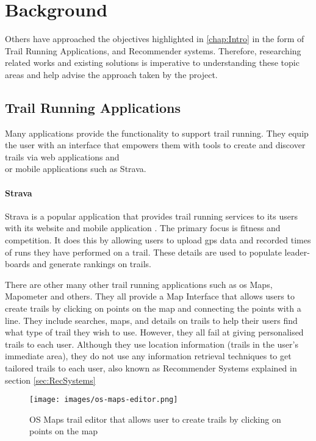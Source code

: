 \chapter{Background}
Others have approached the objectives highlighted in \autoref{chap:Intro} in the form of Trail Running Applications, and Recommender systems. Therefore, researching related works and existing solutions is imperative to understanding these topic areas and help advise the approach taken by the project.

\section{Trail Running Applications} \label{sec:TrailRunningApplications}
Many applications provide the functionality to support trail running. They equip the user with an interface that empowers them with tools to create and discover trails via web applications and\\or mobile applications such as Strava. 

\subsubsection{Strava}
Strava is a popular application that provides trail running services to its users with its website and mobile application \cite{strava}.  The primary focus is fitness and competition.  It does this by allowing users to upload \acrfull{gps} data and recorded times of runs they have performed on a trail. These details are used to populate leader-boards and generate rankings on trails.


There are other many other trail running applications such as \acrfull{os} Maps, Mapometer and others. They all provide a Map Interface that allows users to create trails by clicking on points on the map and connecting the points with a line. They include searches, maps, and details on trails to help their users find what type of trail they wish to use. However, they all fail at giving personalised trails to each user. Although they use location information (trails in the user's immediate area), they do not use any information retrieval techniques to get tailored trails to each user, also known as Recommender Systems explained in section \ref{sec:RecSystems}

\begin{figure}[ht]
    \centering
    \texttt{[image: images/os-maps-editor.png]}
    \caption{OS Maps trail editor that allows user to create trails by clicking on points on the map}
    \label{fig:osMapsEditor}
\end{figure}

